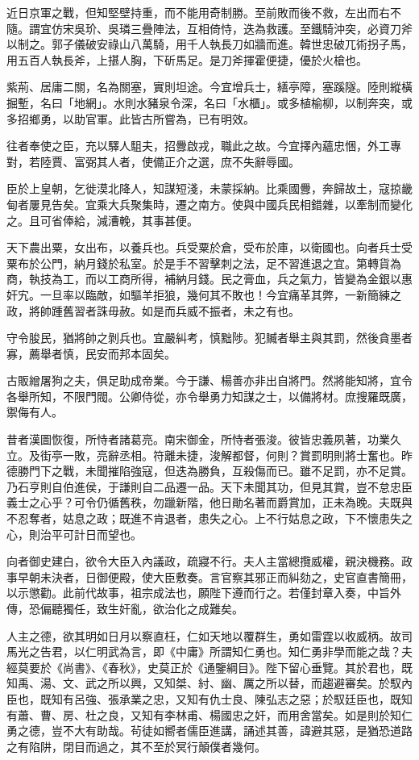 \begin{pinyinscope}
近日京軍之戰，但知堅壁持重，而不能用奇制勝。至前敗而後不救，左出而右不隨。謂宜仿宋吳玠、吳璘三疊陣法，互相倚恃，迭為救護。至鐵騎沖突，必資刀斧以制之。郭子儀破安祿山八萬騎，用千人執長刀如牆而進。韓世忠破兀術拐子馬，用五百人執長斧，上揕人胸，下斫馬足。是刀斧揮霍便捷，優於火槍也。

紫荊、居庸二關，名為關塞，實則坦途。今宜增兵士，繕亭障，塞蹊隧。陸則縱橫掘塹，名曰「地網」。水則水豬泉令深，名曰「水櫃」。或多植榆柳，以制奔突，或多招鄉勇，以助官軍。此皆古所嘗為，已有明效。

往者奉使之臣，充以驛人駔夫，招釁啟戎，職此之故。今宜擇內蘊忠悃，外工專對，若陸賈、富弼其人者，使備正介之選，庶不失辭辱國。

臣於上皇朝，乞徙漠北降人，知謀短淺，未蒙採納。比乘國釁，奔歸故土，寇掠畿甸者屢見告矣。宜乘大兵聚集時，遷之南方。使與中國兵民相錯雜，以牽制而變化之。且可省俸給，減漕輓，其事甚便。

天下農出粟，女出布，以養兵也。兵受粟於倉，受布於庫，以衛國也。向者兵士受粟布於公門，納月錢於私室。於是手不習擊刺之法，足不習進退之宜。第轉貨為商，執技為工，而以工商所得，補納月錢。民之膏血，兵之氣力，皆變為金銀以惠奸宄。一旦率以臨敵，如驅羊拒狼，幾何其不敗也！今宜痛革其弊，一新簡練之政，將帥踵舊習者誅毋赦。如是而兵威不振者，未之有也。

守令朘民，猶將帥之剝兵也。宜嚴糾考，慎黜陟。犯贓者舉主與其罰，然後貪墨者寡，薦舉者慎，民安而邦本固矣。

古販繒屠狗之夫，俱足助成帝業。今于謙、楊善亦非出自將門。然將能知將，宜令各舉所知，不限門閥。公卿侍從，亦令舉勇力知謀之士，以備將材。庶搜羅既廣，禦侮有人。

昔者漢圖恢復，所恃者諸葛亮。南宋御金，所恃者張浚。彼皆忠義夙著，功業久立。及街亭一敗，亮辭丞相。符離未捷，浚解都督，何則？賞罰明則將士奮也。昨德勝門下之戰，未聞摧陷強寇，但迭為勝負，互殺傷而已。雖不足罰，亦不足賞。乃石亨則自伯進侯，于謙則自二品遷一品。天下未聞其功，但見其賞，豈不怠忠臣義士之心乎？可令仍循舊秩，勿躐新階，他日勛名著而爵賞加，正未為晚。夫既與不忍奪者，姑息之政；既進不肯退者，患失之心。上不行姑息之政，下不懷患失之心，則治平可計日而望也。

向者御史建白，欲令大臣入內議政，疏寢不行。夫人主當總攬威權，親決機務。政事早朝未決者，日御便殿，使大臣敷奏。言官察其邪正而糾劾之，史官直書簡冊，以示懲勸。此前代故事，祖宗成法也，願陛下遵而行之。若僅封章入奏，中旨外傳，恐偏聽獨任，致生奸亂，欲治化之成難矣。

人主之德，欲其明如日月以察直枉，仁如天地以覆群生，勇如雷霆以收威柄。故司馬光之告君，以仁明武為言，即《中庸》所謂知仁勇也。知仁勇非學而能之哉？夫經莫要於《尚書》、《春秋》，史莫正於《通鑒綱目》。陛下留心垂覽。其於君也，既知禹、湯、文、武之所以興，又知桀、紂、幽、厲之所以替，而趨避審矣。於馭內臣也，既知有呂強、張承業之忠，又知有仇士良、陳弘志之惡；於馭廷臣也，既知有蕭、曹、房、杜之良，又知有李林甫、楊國忠之奸，而用舍當矣。如是則於知仁勇之德，豈不大有助哉。茍徒如嚮者儒臣進講，誦述其善，諱避其惡，是猶恐道路之有陷阱，閉目而過之，其不至於冥行顛僕者幾何。


\end{pinyinscope}
